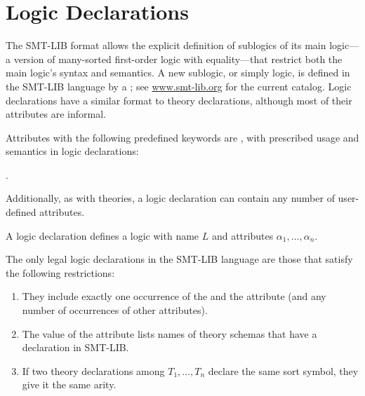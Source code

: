 \section{Logic Declarations} \label{sec:logic-declarations}

The SMT-LIB format allows the explicit definition of
sublogics of its main logic--- a version of many-sorted first-order logic with equality---that 
restrict both the main logic's syntax and semantics.
A new sublogic, or simply logic, is defined in the SMT-LIB language by 
a ; see \href{http://www.smt-lib.org}{www.smt-lib.org} for the current catalog.
Logic declarations have a similar format to theory declarations,
although most of their attributes are informal.

Attributes with the following predefined keywords are 
, with prescribed usage and semantics 
in logic declarations:
\begin{center}
\qquad
{}\qquad
{}\qquad
{}\qquad
{} .
\end{center}
Additionally, 
as with theories, a logic declaration can contain any number of user-defined attributes.
\bigskip

\cLogics
\bigskip

A logic declaration 
defines a logic with name $L$ and attributes $\alpha_1, \ldots, \alpha_n$.

\begin{constraint}
The only legal logic declarations in the SMT-LIB language are those 
that satisfy the following restrictions:

\begin{enumerate}
\item
They include exactly one occurrence of the  and 
the  attribute
(and any number of occurrences of other attributes).

\item
The value  of the  attribute lists
names of theory schemas that have a declaration in SMT-LIB.

\item
If two theory declarations among $T_1, \ldots, T_n$ declare 
the same sort symbol, they give it the same arity.
\end{enumerate}
\end{constraint}


